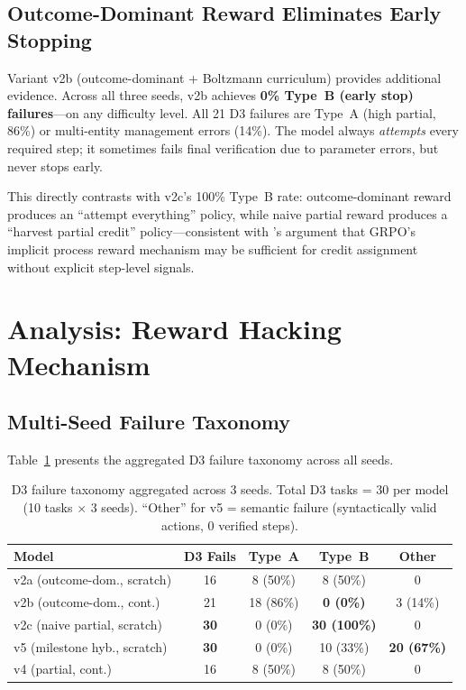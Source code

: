 \documentclass[11pt]{article}
\begin{document}
\subsection{Outcome-Dominant Reward Eliminates Early Stopping}

Variant v2b (outcome-dominant + Boltzmann curriculum) provides additional evidence.
Across all three seeds, v2b achieves \textbf{0\% Type~B (early stop) failures}---on any difficulty level.
All 21 D3 failures are Type~A (high partial, 86\%) or multi-entity management errors (14\%).
The model always \emph{attempts} every required step; it sometimes fails final verification due to parameter errors, but never stops early.

This directly contrasts with v2c's 100\% Type~B rate: outcome-dominant reward produces an ``attempt everything'' policy, while naive partial reward produces a ``harvest partial credit'' policy---consistent with \citet{sullivan2025grpoprm}'s argument that GRPO's implicit process reward mechanism may be sufficient for credit assignment without explicit step-level signals.

\section{Analysis: Reward Hacking Mechanism}
\label{sec:analysis}

\subsection{Multi-Seed Failure Taxonomy}

Table~\ref{tab:taxonomy} presents the aggregated D3 failure taxonomy across all seeds.

\begin{table}[t]
\centering
\caption{D3 failure taxonomy aggregated across 3 seeds. Total D3 tasks = 30 per model (10 tasks $\times$ 3 seeds). ``Other'' for v5 = semantic failure (syntactically valid actions, 0 verified steps).}
\label{tab:taxonomy}
\small
\begin{tabular}{@{}lcccc@{}}
\toprule
\textbf{Model} & \textbf{D3 Fails} & \textbf{Type~A} & \textbf{Type~B} & \textbf{Other} \\
\midrule
v2a (outcome-dom., scratch) & 16 & 8 (50\%) & 8 (50\%) & 0 \\
v2b (outcome-dom., cont.) & 21 & 18 (86\%) & \textbf{0 (0\%)} & 3 (14\%) \\
v2c (naive partial, scratch) & \textbf{30} & 0 (0\%) & \textbf{30 (100\%)} & 0 \\
v5 (milestone hyb., scratch) & \textbf{30} & 0 (0\%) & 10 (33\%) & \textbf{20 (67\%)} \\
v4 (partial, cont.) & 16 & 8 (50\%) & 8 (50\%) & 0 \\
\bottomrule
\end{tabular}
\end{table}
\end{document}
